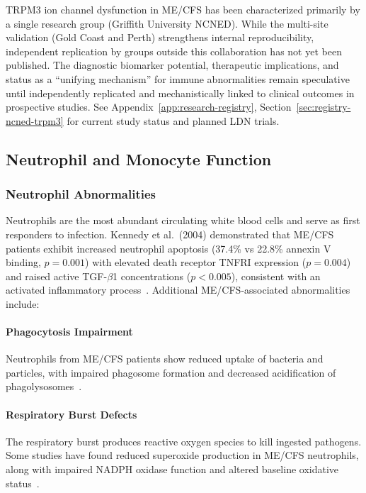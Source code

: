\begin{limitation}
TRPM3 ion channel dysfunction in ME/CFS has been characterized primarily by a single research group (Griffith University NCNED). While the multi-site validation (Gold Coast and Perth) strengthens internal reproducibility, independent replication by groups outside this collaboration has not yet been published. The diagnostic biomarker potential, therapeutic implications, and status as a ``unifying mechanism'' for immune abnormalities remain speculative until independently replicated and mechanistically linked to clinical outcomes in prospective studies. See Appendix~\ref{app:research-registry}, Section~\ref{sec:registry-ncned-trpm3} for current study status and planned LDN trials.
\end{limitation}

\subsection{Neutrophil and Monocyte Function}
\label{sec:neutrophils-monocytes}

\subsubsection{Neutrophil Abnormalities}

Neutrophils are the most abundant circulating white blood cells and serve as first responders to infection. Kennedy et al.\ (2004) demonstrated that ME/CFS patients exhibit increased neutrophil apoptosis (37.4\% vs 22.8\% annexin V binding, $p = 0.001$) with elevated death receptor TNFRI expression ($p = 0.004$) and raised active TGF-$\beta$1 concentrations ($p < 0.005$), consistent with an activated inflammatory process~\cite{Kennedy2004}. Additional ME/CFS-associated abnormalities include:

\paragraph{Phagocytosis Impairment}
Neutrophils from ME/CFS patients show reduced uptake of bacteria and particles, with impaired phagosome formation and decreased acidification of phagolysosomes~\cite{EatonFitch2019}.

\paragraph{Respiratory Burst Defects}
The respiratory burst produces reactive oxygen species to kill ingested pathogens. Some studies have found reduced superoxide production in ME/CFS neutrophils, along with impaired NADPH oxidase function and altered baseline oxidative status~\cite{EatonFitch2019}.

